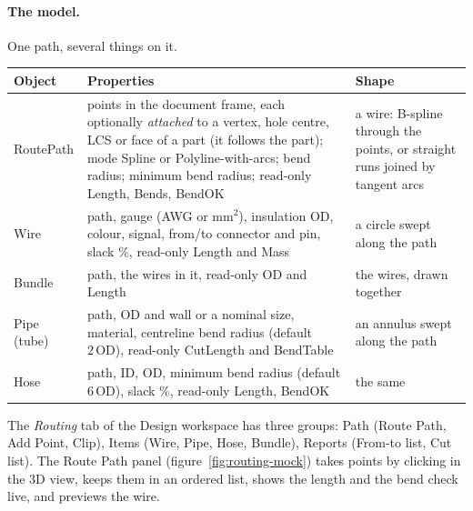 \paragraph{The model.} One path, several things on it.
\begin{center}
\small
\begin{tabularx}{\linewidth}{@{}l>{\hsize=1.15\hsize}X>{\hsize=0.85\hsize}X@{}}
\toprule
Object & Properties & Shape\\
\midrule
RoutePath & points in the document frame, each optionally \emph{attached} to a vertex, hole centre, LCS or face of a
  part (it follows the part); mode Spline or Polyline-with-arcs; bend radius; minimum bend radius; read-only
  Length, Bends, BendOK & a wire: B-spline through the points, or straight runs joined by tangent arcs\\
Wire & path, gauge (AWG or mm$^2$), insulation OD, colour, signal, from/to connector and pin, slack \%, read-only
  Length and Mass & a circle swept along the path\\
Bundle & path, the wires in it, read-only OD and Length & the wires, drawn together\\
Pipe (tube) & path, OD and wall or a nominal size, material, centreline bend radius (default $2\,\text{OD}$),
  read-only CutLength and BendTable & an annulus swept along the path\\
Hose & path, ID, OD, minimum bend radius (default $6\,\text{OD}$), slack \%, read-only Length, BendOK & the same\\
\bottomrule
\end{tabularx}
\end{center}
The \emph{Routing} tab of the Design workspace has three groups: Path (Route Path, Add Point, Clip), Items
(Wire, Pipe, Hose, Bundle), Reports (From-to list, Cut list). The Route Path panel (figure~\ref{fig:routing-mock})
takes points by clicking in the 3D view, keeps them in an ordered list, shows the length and the bend check live,
and previews the wire.

